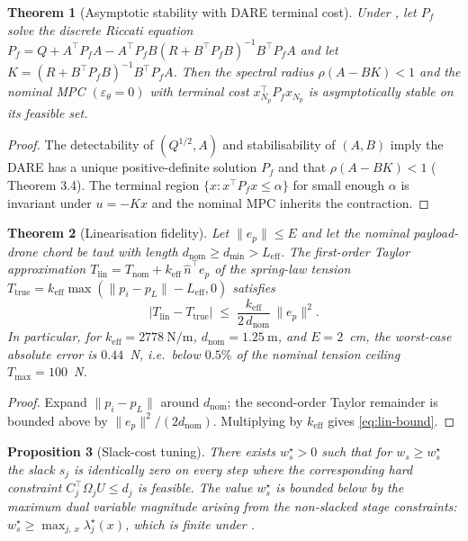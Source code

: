 \documentclass[11pt,a4paper]{article}
\theoremstyle{plain}
\newtheorem{theorem}{Theorem}
\newtheorem{proposition}[theorem]{Proposition}
\theoremstyle{definition}
\begin{document}
\begin{theorem}[Asymptotic stability with DARE terminal cost]\label{thm:mpc-stab}
Under , let $P_f$ solve the discrete Riccati equation
$P_f = Q + A^\top P_f A - A^\top P_f B (R + B^\top P_f B)^{-1} B^\top P_f A$
and let $K = (R + B^\top P_f B)^{-1} B^\top P_f A$. Then the
spectral radius $\rho(A-BK) < 1$ and the nominal MPC
$(\varepsilon_\theta = 0)$ with terminal cost $x_{N_p}^\top P_f x_{N_p}$
is asymptotically stable on its feasible set.
\end{theorem}

\begin{proof}
The detectability of $(Q^{1/2},A)$ and stabilisability of $(A,B)$
imply the DARE has a unique positive-definite solution $P_f$ and
that $\rho(A-BK) < 1$ (\cite{LaubBook} Theorem 3.4). The terminal
region $\{x : x^\top P_f x \le \alpha\}$ for small enough $\alpha$
is invariant under $u=-Kx$ and the nominal MPC inherits the
contraction.
\end{proof}

\begin{theorem}[Linearisation fidelity]\label{thm:lin-fidelity}
Let $\|e_p\| \le E$ and let the nominal payload-drone chord be taut
with length $d_\mathrm{nom} \ge d_\mathrm{min} > L_\mathrm{eff}$. The
first-order Taylor approximation
$T_\mathrm{lin} = T_\mathrm{nom} + k_\mathrm{eff}\, \hat n^\top e_p$
of the spring-law tension
$T_\mathrm{true} = k_\mathrm{eff}\max(\|p_i - p_L\|-L_\mathrm{eff}, 0)$
satisfies
\begin{equation}
|T_\mathrm{lin} - T_\mathrm{true}| \;\le\;
    \frac{k_\mathrm{eff}}{2\,d_\mathrm{nom}}\,\|e_p\|^2.
\label{eq:lin-bound}
\end{equation}
In particular, for $k_\mathrm{eff} = 2778~\mathrm{N/m}$,
$d_\mathrm{nom} = 1.25~\mathrm{m}$, and $E = 2$~cm, the worst-case
absolute error is $0.44$~N, i.e.~below $0.5\%$ of the nominal
tension ceiling $T_\mathrm{max} = 100$~N.
\end{theorem}

\begin{proof}
Expand $\|p_i - p_L\|$ around $d_\mathrm{nom}$; the second-order
Taylor remainder is bounded above by $\|e_p\|^2/(2 d_\mathrm{nom})$.
Multiplying by $k_\mathrm{eff}$ gives \eqref{eq:lin-bound}.
\end{proof}

\begin{proposition}[Slack-cost tuning]\label{prop:ws}
There exists $w_s^\star>0$ such that for $w_s\ge w_s^\star$ the
slack $s_j$ is identically zero on every step where the corresponding
hard constraint $C_j^\top \Omega_j U \le d_j$ is feasible. The value
$w_s^\star$ is bounded below by the maximum dual variable magnitude
arising from the non-slacked stage constraints:
$w_s^\star \ge \max_{j,\,x}\lambda_j^\star(x)$, which is finite
under .
\end{proposition}
\end{document}
